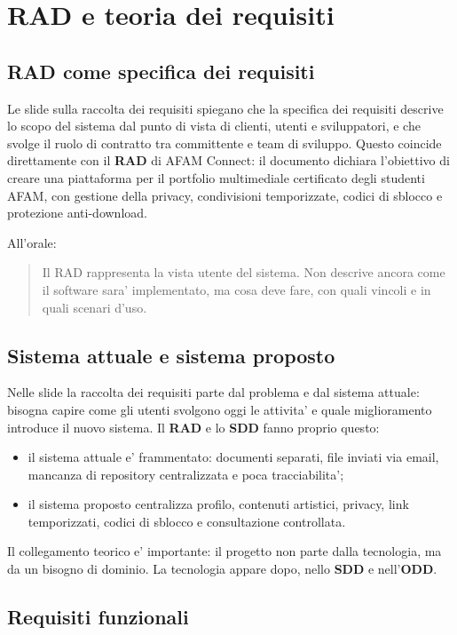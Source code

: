 ﻿\documentclass[11pt,a4paper]{article}
\newcommand{\doc}[1]{\textbf{#1}}
\begin{document}
\section{RAD e teoria dei requisiti}

\subsection{RAD come specifica dei requisiti}

Le slide sulla raccolta dei requisiti spiegano che la specifica dei requisiti descrive lo
scopo del sistema dal punto di vista di clienti, utenti e sviluppatori, e che svolge il ruolo
di contratto tra committente e team di sviluppo. Questo coincide direttamente con il
\doc{RAD} di AFAM Connect: il documento dichiara l'obiettivo di creare una piattaforma
per il portfolio multimediale certificato degli studenti AFAM, con gestione della privacy,
condivisioni temporizzate, codici di sblocco e protezione anti-download.

All'orale:
\begin{quote}
Il RAD rappresenta la vista utente del sistema. Non descrive ancora come il software sara'
implementato, ma cosa deve fare, con quali vincoli e in quali scenari d'uso.
\end{quote}

\subsection{Sistema attuale e sistema proposto}

Nelle slide la raccolta dei requisiti parte dal problema e dal sistema attuale: bisogna
capire come gli utenti svolgono oggi le attivita' e quale miglioramento introduce il nuovo
sistema. Il \doc{RAD} e lo \doc{SDD} fanno proprio questo:
\begin{itemize}
  \item il sistema attuale e' frammentato: documenti separati, file inviati via email,
  mancanza di repository centralizzata e poca tracciabilita';
  \item il sistema proposto centralizza profilo, contenuti artistici, privacy, link
  temporizzati, codici di sblocco e consultazione controllata.
\end{itemize}

Il collegamento teorico e' importante: il progetto non parte dalla tecnologia, ma da un
bisogno di dominio. La tecnologia appare dopo, nello \doc{SDD} e nell'\doc{ODD}.

\subsection{Requisiti funzionali}
\end{document}
